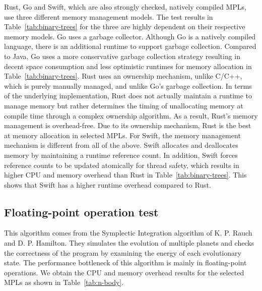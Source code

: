 Rust, Go and Swift, which are also strongly checked, natively compiled MPLs,
use three different memory management models.
The test results in Table~\ref{tab:binary-trees} for the three are highly dependent on their
respective memory models.
Go uses a garbage collector.
Although Go is a natively compiled language, there is an additional runtime to support garbage collection.
Compared to Java, Go uses a more conservative garbage collection strategy
resulting in decent space consumption and less optimistic runtimes for memory
allocation in Table~\ref{tab:binary-trees}.
Rust uses an ownership mechanism,
unlike C/C++, which is purely manually managed, and unlike Go's garbage collection.
In terms of the underlying implementation, Rust does not actually maintain a runtime
to manage memory but rather determines the timing of unallocating memory at compile
time through a complex ownership algorithm.
As a result, Rust's memory management is overhead-free.
Due to its ownership mechanism, Rust is the best at memory allocation in selected MPLs.
For Swift, the memory management mechanism is different from all of the above.
Swift allocates and deallocates memory by maintaining a runtime reference count.
In addition, Swift forces reference counts to be updated atomically for thread safety,
which results in higher CPU and memory overhead than Rust in Table~\ref{tab:binary-trees}.
This shows that Swift has a higher runtime overhead compared to Rust.

\subsection{Floating-point operation test}

This algorithm comes from the Symplectic Integration algorithm of K. P. Rauch and D. P. Hamilton.
They simulates the evolution of multiple planets and checks the correctness of the program
by examining the energy of each evolutionary state.
The performance bottleneck of this algorithm is mainly in floating-point operations.
We obtain the CPU and memory overhead results
for the selected MPLs as shown in Table~\ref{tab:n-body}.


